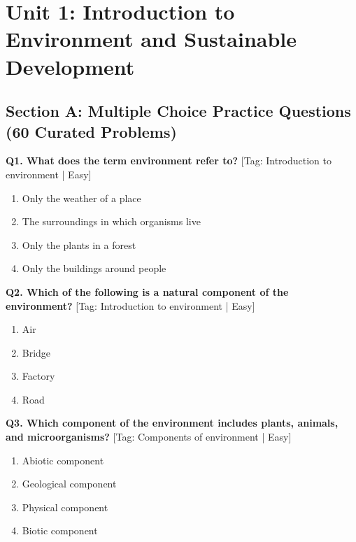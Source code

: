 \chapter{Unit 1: Introduction to Environment and Sustainable Development}

\section{Section A: Multiple Choice Practice Questions (60 Curated Problems)}

\noindent\textbf{Q1. What does the term environment refer to?} \hfill [Tag: Introduction to environment | Easy]
\begin{enumerate}[label=(\alph*),topsep=2pt,itemsep=1pt,partopsep=0pt,parsep=0pt]
    \item {Only the weather of a place}
    \item {The surroundings in which organisms live}
    \item {Only the plants in a forest}
    \item {Only the buildings around people}
\end{enumerate}
\vspace{2mm}

\noindent\textbf{Q2. Which of the following is a natural component of the environment?} \hfill [Tag: Introduction to environment | Easy]
\begin{enumerate}[label=(\alph*),topsep=2pt,itemsep=1pt,partopsep=0pt,parsep=0pt]
    \item {Air}
    \item {Bridge}
    \item {Factory}
    \item {Road}
\end{enumerate}
\vspace{2mm}

\noindent\textbf{Q3. Which component of the environment includes plants, animals, and microorganisms?} \hfill [Tag: Components of environment | Easy]
\begin{enumerate}[label=(\alph*),topsep=2pt,itemsep=1pt,partopsep=0pt,parsep=0pt]
    \item {Abiotic component}
    \item {Geological component}
    \item {Physical component}
    \item {Biotic component}
\end{enumerate}
\vspace{2mm}

